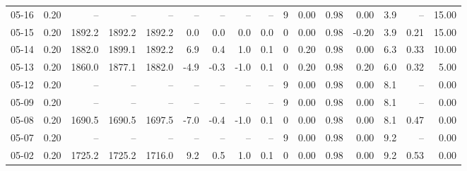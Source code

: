\begin{threeparttable}
{\begin{tabular}{lrrrrrrrrrrrrrrr}
  05-16 &     0.20 &     -- &     -- &     -- &         -- &             -- &                       -- &                  -- &              9 &       0.00 &      0.98 &           0.00 &              3.9 &              -- &                  15.00 \\
  05-15 &     0.20 & 1892.2 & 1892.2 & 1892.2 &        0.0 &            0.0 &                      0.0 &                 0.0 &              0 &       0.00 &      0.98 &          -0.20 &              3.9 &            0.21 &                  15.00 \\
  05-14 &     0.20 & 1882.0 & 1899.1 & 1892.2 &        6.9 &            0.4 &                      1.0 &                 0.1 &              0 &       0.20 &      0.98 &           0.00 &              6.3 &            0.33 &                  10.00 \\
  05-13 &     0.20 & 1860.0 & 1877.1 & 1882.0 &       -4.9 &           -0.3 &                     -1.0 &                 0.1 &              0 &       0.20 &      0.98 &           0.20 &              6.0 &            0.32 &                   5.00 \\
  05-12 &     0.20 &     -- &     -- &     -- &         -- &             -- &                       -- &                  -- &              9 &       0.00 &      0.98 &           0.00 &              8.1 &              -- &                   0.00 \\
  05-09 &     0.20 &     -- &     -- &     -- &         -- &             -- &                       -- &                  -- &              9 &       0.00 &      0.98 &           0.00 &              8.1 &              -- &                   0.00 \\
  05-08 &     0.20 & 1690.5 & 1690.5 & 1697.5 &       -7.0 &           -0.4 &                     -1.0 &                 0.1 &              0 &       0.00 &      0.98 &           0.00 &              8.1 &            0.47 &                   0.00 \\
  05-07 &     0.20 &     -- &     -- &     -- &         -- &             -- &                       -- &                  -- &              9 &       0.00 &      0.98 &           0.00 &              9.2 &              -- &                   0.00 \\
  05-02 &     0.20 & 1725.2 & 1725.2 & 1716.0 &        9.2 &            0.5 &                      1.0 &                 0.1 &              0 &       0.00 &      0.98 &           0.00 &              9.2 &            0.53 &                   0.00 \\

\end{tabular}}
\end{threeparttable}
